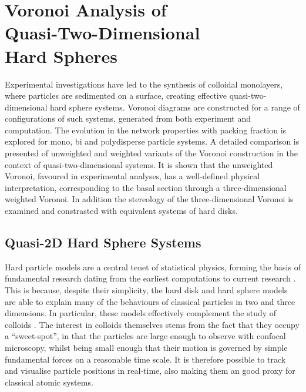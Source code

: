 \chapter[Voronoi Analysis of Quasi\--Two\--Dimensional Hard Spheres]{Voronoi Analysis of \\ Quasi\--Two\--Dimensional \\ Hard Spheres} 
\label{ch:quasi2d}

\begin{chapterabstract}
Experimental investigations have led to the synthesis of colloidal monolayers, where particles are sedimented on a surface, creating effective quasi\--two\--dimensional hard sphere systems.
Voronoi diagrams are constructed for a range of configurations of such systems, generated from both experiment and computation.
The evolution in the network properties with packing fraction is explored for mono, bi and polydisperse particle systems.
A detailed comparison is presented of unweighted and weighted variants of the Voronoi construction in the context of quasi\--two\--dimensional systems.
It is shown that the \td{} unweighted Voronoi, favoured in experimental analyses, has a well\--defined physical interpretation, corresponding to the basal section through a three\--dimensional weighted Voronoi.
In addition the stereology of the three\--dimensional Voronoi is examined and constrasted with equivalent systems of hard disks.
\end{chapterabstract}

\section{Quasi\--2D Hard Sphere Systems}

Hard particle models are a central tenet of statistical physics, forming the basis of fundamental research dating from the earliest computations to current research \cite{Isobe2016}.
This is because, despite their simplicity, the hard disk and hard sphere models are able to explain many of the behaviours of classical particles in two and three dimensions.
In particular, these models effectively complement the study of colloids \cite{Pusey1986}.
The interest in colloids themselves stems from the fact that they occupy a ``sweet\--spot'', in that the particles are large enough to observe with confocal microscopy, whilst being small enough that their motion is governed by simple fundamental forces on a reasonable time scale. 
It is therefore possible to track and visualise particle positions in real\--time, also making them an good proxy for classical atomic systems.


